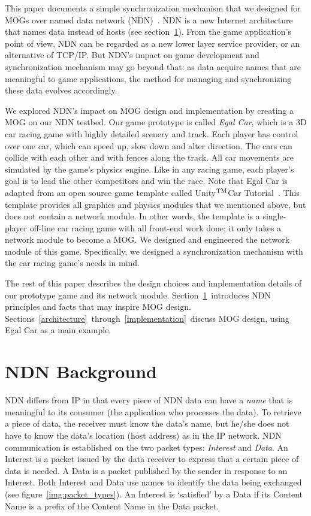 \documentclass{article}
\def\tm{\leavevmode\hbox{$\rm {}^{TM}$}} %
\begin{document}
This paper documents a simple synchronization mechanism that we designed for MOGs over named data network (NDN)~\cite{Jndn}. NDN is a new Internet architecture that names data instead of hosts (see section~\ref{ndnbackground}). From the game application's point of view, NDN can be regarded as a new lower layer service provider, or an alternative of TCP\slash IP. But NDN's impact on game development and synchronization mechanism may go beyond that: as data acquire names that are meaningful to game applications, the method for managing and synchronizing these data evolves accordingly. %

We explored NDN's impact on MOG design and implementation by creating a MOG on our NDN testbed. Our game prototype is called \emph{Egal Car}, which is a 3D car racing game with highly detailed scenery and track. Each player has control over one car, which can speed up, slow down and alter direction. The cars can collide with each other and with fences along the track. All car movements are simulated by the game's physics engine. Like in any racing game, each player's goal is to lead the other competitors and win the race. Note that Egal Car is adapted from an open source game template called Unity\tm  Car Tutorial~\cite{UnityCar}. This template provides all graphics and physics modules that we mentioned above, but does not contain a network module. In other words, the template is a single-player off-line car racing game with all front-end work done; it only takes a network module to become a MOG. We designed and engineered the network module of this game. Specifically, we designed a synchronization mechanism with the car racing game's needs in mind. 

The rest of this paper describes the design choices and implementation details of our prototype game and its network module. Section~\ref{ndnbackground}~introduces NDN principles and facts that may inspire MOG design. Sections~\ref{architecture}~through~\ref{implementation}~discuss MOG design, using Egal Car as a main example.


\section{NDN Background}
\label{ndnbackground}

NDN differs from IP in that every piece of NDN data can have a \emph{name} that is meaningful to its consumer (the application who processes the data). To retrieve a piece of data, the receiver must know the data's name, but he/she does not have to know the data's location (host address) as in the IP network. NDN communication is established on the two packet types: \emph{Interest} and \emph{Data}. An Interest is a packet issued by the data receiver to express that a certain piece of data is needed. A Data is a packet published by the sender in response to an Interest. Both Interest and Data use names to identify the data being exchanged (see figure~\ref{img:packet_types}). An Interest is `satisfied' by a Data if its Content Name is a prefix of the Content Name in the Data packet.~\cite{Jndn}
\end{document}
